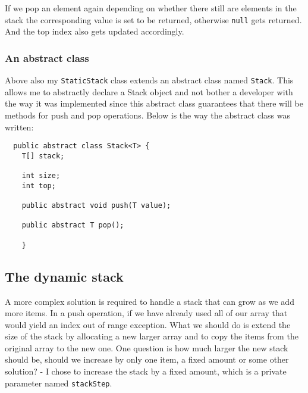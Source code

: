 \documentclass[a4paper,11pt]{article}
\begin{document}
If we pop an element again depending on whether there still are elements in the stack the corresponding value is set to be returned, otherwise {\tt null} gets returned. And the top index also gets updated accordingly.

\subsubsection*{An abstract class}

Above also my {\tt StaticStack} class extends an abstract class named {\tt Stack}. This allows me to abstractly declare a Stack object and not bother a developer with the way it was implemented since this abstract class guarantees that there will be methods for push and pop operations. Below is the way the abstract class was written:

\begin{verbatim}
  public abstract class Stack<T> {
    T[] stack;

    int size;
    int top;

    public abstract void push(T value);

    public abstract T pop();
    
    }
\end{verbatim}


\subsection*{The dynamic stack}

A more complex solution is required to handle a stack that can grow as we add more items. In a push operation, if we have already used all of our array that would yield an index out of range exception. What we should do is extend the size of the stack by allocating a new larger array and to copy the items from the original array to the new one.
One question is how much larger the new stack should be, should we increase
by only one item, a fixed amount or some other solution? - I chose to increase the stack by a fixed amount, which is a private parameter named {\tt stackStep}.
\end{document}
